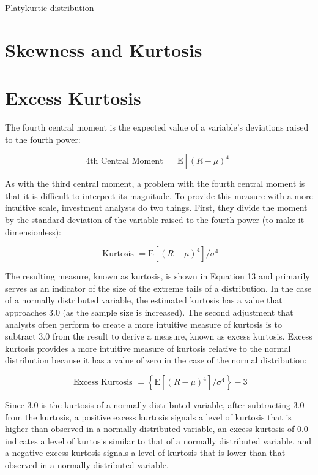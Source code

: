 \documentclass[11pt]{article}
\begin{document}
Platykurtic distribution

\section*{Skewness and Kurtosis}
\section*{Excess Kurtosis}
The fourth central moment is the expected value of a variable's deviations raised to the fourth power:


\begin{equation*}
\text { 4th Central Moment }=\mathrm{E}\left[(R-\mu)^{4}\right] \tag{12}
\end{equation*}


As with the third central moment, a problem with the fourth central moment is that it is difficult to interpret its magnitude. To provide this measure with a more intuitive scale, investment analysts do two things. First, they divide the moment by the standard deviation of the variable raised to the fourth power (to make it dimensionless):


\begin{equation*}
\text { Kurtosis }=\mathrm{E}\left[(R-\mu)^{4}\right] / \sigma^{4} \tag{13}
\end{equation*}


The resulting measure, known as kurtosis, is shown in Equation 13 and primarily serves as an indicator of the size of the extreme tails of a distribution. In the case of a normally distributed variable, the estimated kurtosis has a value that approaches 3.0 (as the sample size is increased). The second adjustment that analysts often perform to create a more intuitive measure of kurtosis is to subtract 3.0 from the result to derive a measure, known as excess kurtosis. Excess kurtosis provides a more intuitive measure of kurtosis relative to the normal distribution because it has a value of zero in the case of the normal distribution:


\begin{equation*}
\text { Excess Kurtosis }=\left\{\mathrm{E}\left[(R-\mu)^{4}\right] / \sigma^{4}\right\}-3 \tag{14}
\end{equation*}


Since 3.0 is the kurtosis of a normally distributed variable, after subtracting 3.0 from the kurtosis, a positive excess kurtosis signals a level of kurtosis that is higher than observed in a normally distributed variable, an excess kurtosis of 0.0 indicates a level of kurtosis similar to that of a normally distributed variable, and a negative excess kurtosis signals a level of kurtosis that is lower than that observed in a normally distributed variable.
\end{document}
